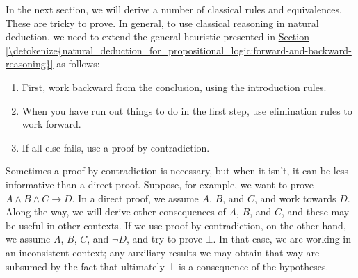 \documentclass[letterpaper,10pt,english]{sphinxmanual}
\begin{document}
\begin{sphinxVerbatim}[commandchars=\\\{\}]
 

          
        
       
           
            
      
                

\end{sphinxVerbatim}

\sphinxAtStartPar
In the next section, we will derive a number of classical rules and equivalences. These are tricky to prove. In general, to use classical reasoning in natural deduction, we need to extend the general heuristic presented in \hyperref[\detokenize{natural_deduction_for_propositional_logic:forward-and-backward-reasoning}]{Section \ref{\detokenize{natural_deduction_for_propositional_logic:forward-and-backward-reasoning}}} as follows:
\begin{enumerate}
%
\item {} 
\sphinxAtStartPar
First, work backward from the conclusion, using the introduction rules.

\item {} 
\sphinxAtStartPar
When you have run out things to do in the first step, use elimination rules to work forward.

\item {} 
\sphinxAtStartPar
If all else fails, use a proof by contradiction.

\end{enumerate}

\sphinxAtStartPar
Sometimes a proof by contradiction is necessary, but when it isn’t, it can be less informative than a direct proof. Suppose, for example, we want to prove \(A \wedge B \wedge C \to D\). In a direct proof, we assume \(A\), \(B\), and \(C\), and work towards \(D\). Along the way, we will derive other consequences of \(A\), \(B\), and \(C\), and these may be useful in other contexts. If we use proof by contradiction, on the other hand, we assume \(A\), \(B\), \(C\), and \(\neg D\), and try to prove \(\bot\). In that case, we are working in an inconsistent context; any auxiliary results we may obtain that way are subsumed by the fact that ultimately \(\bot\) is a consequence of the hypotheses.
\end{document}
